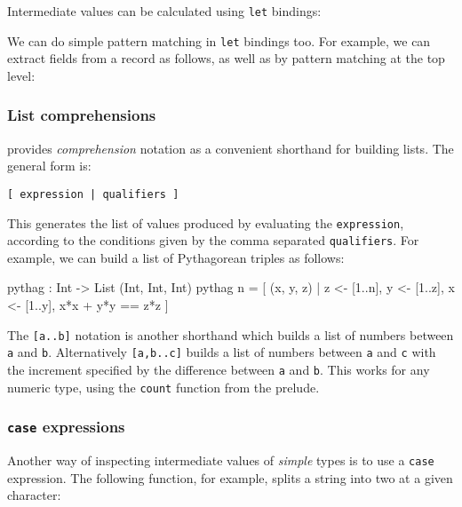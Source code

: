 Intermediate values can be calculated using \texttt{let} bindings:

 
\noindent
We can do simple pattern matching in \texttt{let} bindings too.
For example, we can extract fields from a record as follows, as well as by pattern matching at the top level:

 
\subsubsection*{List comprehensions}
\label{sec:listcomp}

\Idris{} provides \emph{comprehension} notation as a convenient shorthand for building lists.
The general form is:

\begin{lstlisting}[style=stdout]
[ expression | qualifiers ]
\end{lstlisting}
 
\noindent
This generates the list of values produced by evaluating the \texttt{expression}, according to the conditions given by the comma separated \texttt{qualifiers}.
For example, we can build a list of Pythagorean triples as follows:

\begin{code}
pythag : Int -> List (Int, Int, Int)
pythag n = [ (x, y, z) | z <- [1..n], y <- [1..z], x <- [1..y],
                         x*x + y*y == z*z ]
\end{code}
 

\noindent
The \texttt{[a..b]} notation is another shorthand which builds a list of numbers between \texttt{a} and \texttt{b}.
Alternatively \texttt{[a,b..c]} builds a list of numbers between \texttt{a} and \texttt{c} with the increment specified by the difference between \texttt{a} and \texttt{b}.
This works for any numeric type, using the \texttt{count} function from the prelude. 

\subsubsection*{\texttt{case} expressions}

Another way of inspecting intermediate values of \emph{simple} types
is to use a \texttt{case} expression.
The following function, for example, splits a string into two at a given character:

